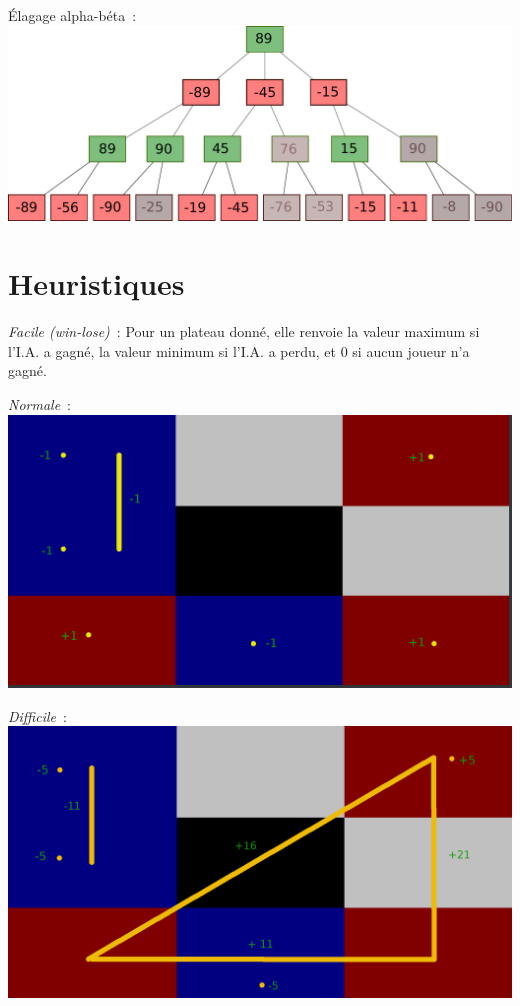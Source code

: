 \documentclass[11pt]{beamer}
\begin{document}
\begin{frame}
    Élagage alpha-béta :
    \includegraphics[width=\linewidth]{negamax-alphabeta}
\end{frame}

\section{Heuristiques}

\begin{frame}
    \emph{Facile (win-lose)} :
    Pour un plateau donné, elle renvoie la valeur maximum si l'I.A. a gagné, la valeur minimum si
    l'I.A. a perdu, et 0 si aucun joueur n'a gagné.
\end{frame}

\begin{frame}
    \emph{Normale} :
    \includegraphics[width=\textwidth]{Heuristic_Normal}{}
\end{frame}

\begin{frame}
    \emph{Difficile} :
    \includegraphics[width=\textwidth]{Heuristic_Hard}{}
\end{frame}
\end{document}
